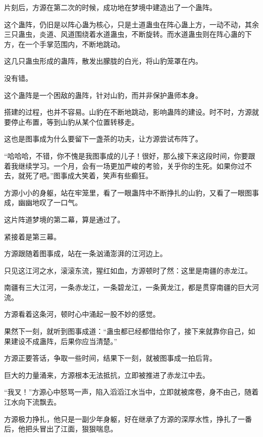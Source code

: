 
\begin{this_body}



片刻后，方源在第二次的时候，成功地在梦境中建造出了一个蛊阵。

这个蛊阵，仍旧是以阵心蛊为核心，只是土道蛊虫在阵心蛊上方，一动不动，其余三只蛊虫，炎道、风道围绕着水道蛊虫，不断旋转。而水道蛊虫则在阵心蛊的下方，在一个手掌范围内，不断地跳动。

这几只蛊虫形成的蛊阵，散发出朦胧的白光，将山豹笼罩在内。

没有错。

这个蛊阵是一个困敌的蛊阵，针对山豹，而并非保护蛊师本身。

搭建的过程，也并不容易。山豹在不断地跳动，影响蛊阵的建设。时不时，方源就要停止布置，等到山豹从某个位置转移走。

这也是图事成为什么要留下一盏茶的功夫，让方源尝试布阵了。

“哈哈哈，不错，你不愧是我图事成的儿子！很好，那么接下来这段时间，你要跟着我继续学习。一个月，会有一场更加严峻的考验，关乎你的生死。如果你过不去，就死了吧。”图事成大笑着，笑声有些癫狂。

方源小小的身躯，站在牢笼里，看了一眼蛊阵中不断挣扎的山豹，又看了一眼图事成，幽幽地叹了一口气。

这片阵道梦境的第二幕，算是通过了。

紧接着是第三幕。

方源跟随着图事成，站在一条汹涌澎湃的江河边上。

只见这江河之水，滚滚东流，猩红如血，方源顿时了然：这里是南疆的赤龙江。

南疆有三大江河，一条赤龙江，一条碧龙江，一条黄龙江，都是贯穿南疆的巨大河流。

方源看着这条河，顿时心中涌起一股不妙的感觉。

果然下一刻，就听到图事成道：“蛊虫都已经都借给你了，接下来就靠你自己，如果建设不成蛊阵，后果你应当清楚。”

方源正要答话，争取一些时间，结果下一刻，就被图事成一拍后背。

巨大的力量涌来，方源根本无法抵抗，立即被推进了赤龙江中去。

“我叉！”方源心中怒骂一声，陷入滔滔江水当中，立即就被席卷，身不由己，随着江水向下流飘去。

方源极力挣扎，他只是一副少年身躯，好在继承了方源的深厚水性，挣扎了一番后，他把头冒出了江面，狠狠喘息。


\end{this_body}
